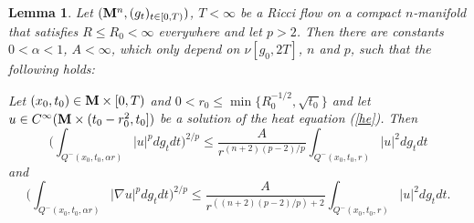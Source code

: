 \documentclass[11pt]{amsart}
\numberwithin{equation}{section}
\newtheorem{lemma}[theorem]{Lemma}
\def\lab{\label}
\def\a{\alpha}
\def\M{{\bf M}}
\def\d{\nabla}
\numberwithin{equation}{section}
\begin{document}
\begin{lemma}
\lab{lemoserHE}
Let $(\M^n, (g_t)_{t \in [0,T)})$, $T < \infty$ be a Ricci flow on a compact $n$-manifold that satisfies $R \leq R_0 < \infty$ everywhere and let $p > 2$.
Then there are constants $0 < \alpha < 1$, $A < \infty$, which only depend on $\nu[g_0, 2T]$, $n$ and $p$, such that the following holds:

Let $(x_0, t_0) \in \M \times [0,T)$ and $0 < r_0 \leq \min \{ R_0^{-1/2}, \sqrt{t_0} \}$ and let $u \in C^\infty (\M \times (t_0 - r_0^2, t_0])$ be a solution of the  heat equation (\ref{he}).
Then
\begin{equation} \label{eq:Lpboundforward}
\bigg( \int_{Q^- (x_0, t_0, \a r)} |u|^p dg_t dt \bigg)^{2/p}
\le \frac{A}{r^{(n+2) (p-2)/p}} \int _{Q^-(x_0, t_0,  r)} |u|^2 dg_t dt
\end{equation}
and
\begin{equation} \label{eq:nablaLpboundforward}
\bigg( \int_{Q^- (x_0, t_0, \a r)} |\d u|^p dg_t dt \bigg)^{2/p}
\le \frac{A}{r^{((n+2) (p-2)/p)+2}} \int _{Q^-(x_0, t_0,  r)} |u|^2 dg_t dt.
\end{equation}
\end{lemma}
\end{document}
